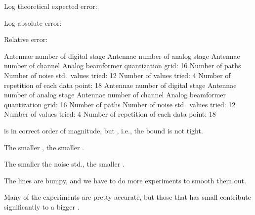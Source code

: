 {
\I Log theoretical expected error:

\I Log absolute error:

\I Relative error:
}
{
\I Antennae number of digital stage 
\I Antennae number of analog stage 
\I Antennae number of channel 
\I Analog beamformer quantization grid: 16
\I Number of paths 
\I Number of noise std.\ values tried: 12
\I Number of \m {\g} values tried: 4
\I Number of repetition of each data point: 18
}
{
\blank [big]
}
{
\blank [big]
}
{
\I Antennae number of digital stage 
\I Antennae number of analog stage 
\I Antennae number of channel 
\I Analog beamformer quantization grid: 16
\I Number of paths 
\I Number of noise std.\ values tried: 12
\I Number of \m {\g} values tried: 4
\I Number of repetition of each data point: 18
}
{
\blank [big]
}
{
\blank [big]
}
{

\I {} is in correct order of magnitude, but , i.e., the bound is not tight.

\I The smaller \m {\g}, the smaller .

\I The smaller the noise std., the smaller .

\I The lines are bumpy, and we have to do more experiments to smooth them out.

\I Many of the experiments are pretty accurate, but those that has small  contribute significantly to a bigger .
}

